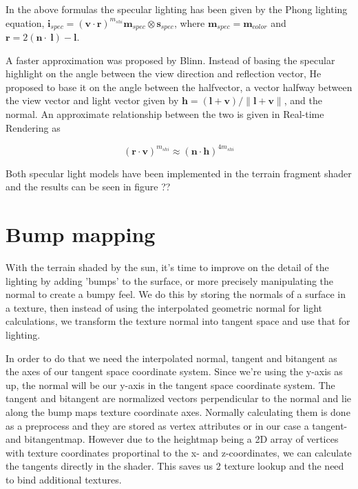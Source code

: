 In the above formulas the specular lighting has been given by the
Phong lighting equation, $\mathbf{i}_{spec} = (\mathbf{v} \cdot
\mathbf{r})^{m_{shi}} \mathbf{m}_{spec} \otimes \mathbf{s}_{spec}$,
where $\mathbf{m}_{spec} = \mathbf{m}_{color}$ and $\mathbf{r} = 2
(\mathbf{n} \cdot \ \mathbf{l}) - \mathbf{l}$.

A faster approximation was proposed by Blinn. Instead of basing the
specular highlight on the angle between the view direction and
reflection vector, He proposed to base it on the angle between the
halfvector, a vector halfway between the view vector and light vector
given by $\mathbf{h} = (\mathbf{l} + \mathbf{v}) / \|\mathbf{l} +
\mathbf{v}\|$, and the normal. An approximate relationship between the
two is given in Real-time Rendering as

\begin{displaymath}
  (\mathbf{r} \cdot \mathbf{v})^{m_{shi}} \approx (\mathbf{n} \cdot \mathbf{h})^{4m_{shi}} 
\end{displaymath}

Both specular light models have been implemented in the terrain
fragment shader and the results can be seen in figure ??



\section{Bump mapping}

With the terrain shaded by the sun, it's time to improve on the detail
of the lighting by adding 'bumps' to the surface, or more precisely
manipulating the normal to create a bumpy feel. We do this by storing
the normals of a surface in a texture, then instead of using the
interpolated geometric normal for light calculations, we transform the
texture normal into tangent space and use that for lighting.

In order to do that we need the interpolated normal, tangent and
bitangent as the axes of our tangent space coordinate system. Since
we're using the y-axis as up, the normal will be our y-axis in the
tangent space coordinate system. The tangent and bitangent are
normalized vectors perpendicular to the normal and lie along the bump
maps texture coordinate axes. Normally calculating them is done as a
preprocess and they are stored as vertex attributes or in our case a
tangent- and bitangentmap. However due to the heightmap being a 2D
array of vertices with texture coordinates proportinal to the x- and
z-coordinates, we can calculate the tangents directly in the
shader. This saves us 2 texture lookup and the need to bind additional
textures.

